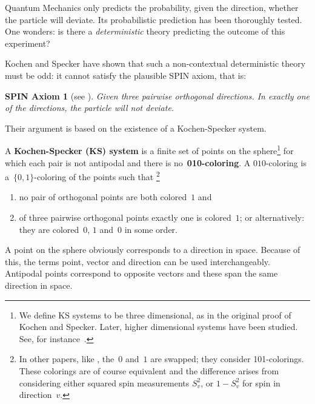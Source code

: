 \documentclass{report}
\newcommand{\keyword}[1]{\textbf{#1}}
\begin{document}
Quantum Mechanics only predicts the probability, given the direction,
whether the particle will deviate.
Its probabilistic prediction has been thoroughly tested.
One wonders: is there a
\emph{deterministic} theory predicting the
outcome of this experiment?

Kochen and Specker have shown that such a non-contextual deterministic
theory must be odd: it cannot satisfy the plausible SPIN
axiom, that is:

\begingroup\makeatletter{}
\newtheorem{spin}{SPIN Axiom}
\begin{spin}[see \cite{ck09}]
    Given three pairwise orthogonal directions.
    In exactly one of the directions, the particle will not deviate.
\end{spin}
\def\@thmcounter#1{\noexpand\arabic{#1}}\makeatother\endgroup

Their argument is based on the existence of a Kochen-Specker system.
\begin{definition}
    A \keyword{Kochen-Specker (KS) system} is
    a finite set of points on the sphere\footnote{
            We define KS systems to be three dimensional,
            as in the original proof of Kochen and Specker.
            Later, higher dimensional systems have been studied.
            See, for instance~\cite[p.~201]{qtcm}.
        }
    for which each pair is not antipodal and
    there is no~\keyword{010-coloring}.
    A $010$-coloring is a~$\{0,1\}$-coloring of the points such that%
        \footnote{
                In other papers, like \cite{aow11},
                the~$0$ and~$1$ are swapped; they consider 101-colorings.
                These colorings are of course equivalent and the
                difference arises from considering either squared
                spin measurements $S_v^2$, or $1-S_v^2$
                for spin in direction~$v$.
               	}
    \begin{enumerate}
        \item
            no pair of orthogonal points are both colored~$1$ and
        \item
            of three pairwise orthogonal points exactly one is colored~$1$;
            or alternatively: they are colored~$0$, $1$ and~$0$ in some order.
    \end{enumerate}
\end{definition}
A point on the sphere obviously corresponds to a direction in space.
Because of this, the terms point, vector and direction
can be used interchangeably. Antipodal points correspond to opposite
vectors and these span the same direction in space.
\end{document}
